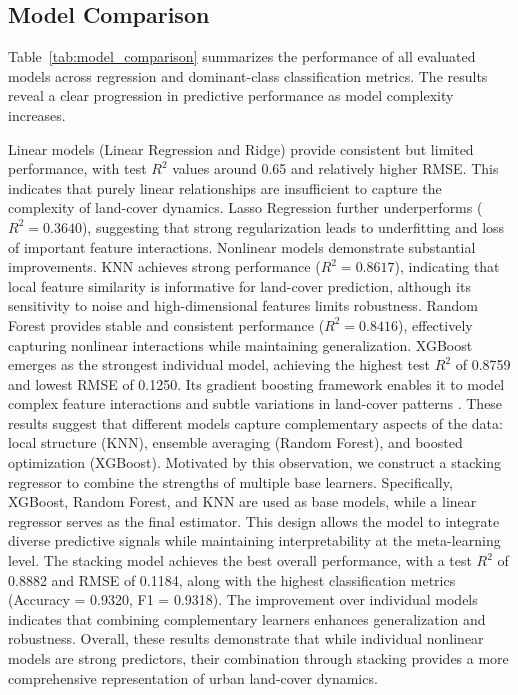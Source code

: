 \documentclass[11pt]{article}
\begin{document}
\subsection{Model Comparison}

\noindent Table~\ref{tab:model_comparison} summarizes the performance of all evaluated models across regression and dominant-class classification metrics. The results reveal a clear progression in predictive performance as model complexity increases.

Linear models (Linear Regression and Ridge) provide consistent but limited performance, with test $R^2$ values around 0.65 and relatively higher RMSE. This indicates that purely linear relationships are insufficient to capture the complexity of land-cover dynamics. Lasso Regression further underperforms ($R^2 = 0.3640$), suggesting that strong regularization leads to underfitting and loss of important feature interactions.
Nonlinear models demonstrate substantial improvements. KNN achieves strong performance ($R^2 = 0.8617$), indicating that local feature similarity is informative for land-cover prediction, although its sensitivity to noise and high-dimensional features limits robustness. Random Forest provides stable and consistent performance ($R^2 = 0.8416$), effectively capturing nonlinear interactions while maintaining generalization.
XGBoost emerges as the strongest individual model, achieving the highest test $R^2$ of 0.8759 and lowest RMSE of 0.1250. Its gradient boosting framework enables it to model complex feature interactions and subtle variations in land-cover patterns \citep{chen2016xgboost, grinsztajn2022tree}. These results suggest that different models capture complementary aspects of the data: local structure (KNN), ensemble averaging (Random Forest), and boosted optimization (XGBoost).
Motivated by this observation, we construct a stacking regressor to combine the strengths of multiple base learners. Specifically, XGBoost, Random Forest, and KNN are used as base models, while a linear regressor serves as the final estimator. This design allows the model to integrate diverse predictive signals while maintaining interpretability at the meta-learning level.
The stacking model achieves the best overall performance, with a test $R^2$ of 0.8882 and RMSE of 0.1184, along with the highest classification metrics (Accuracy = 0.9320, F1 = 0.9318). The improvement over individual models indicates that combining complementary learners enhances generalization and robustness.
Overall, these results demonstrate that while individual nonlinear models are strong predictors, their combination through stacking provides a more comprehensive representation of urban land-cover dynamics. 
\end{document}
